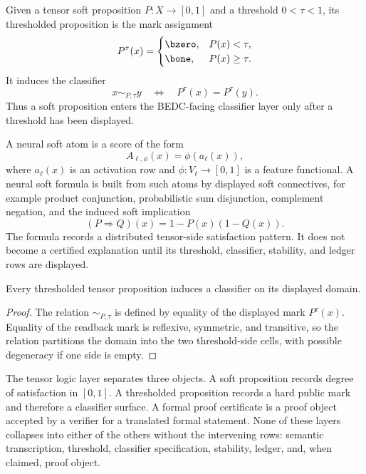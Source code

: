 \begin{definition}
\label{def:large-model-thresholded-tensor-proposition}
Given a tensor soft proposition $P:X\to[0,1]$ and a threshold
$0<\tau<1$, its thresholded proposition is the mark assignment
$$
P^\tau(x)
=
\begin{cases}
\bzero, & P(x)<\tau,\\
\bone, & P(x)\ge\tau.
\end{cases}
$$
It induces the classifier
$$
x\sim_{P,\tau}y
\quad\Longleftrightarrow\quad
P^\tau(x)=P^\tau(y).
$$
Thus a soft proposition enters the BEDC-facing classifier layer only
after a threshold has been displayed.
\end{definition}

\begin{definition}
\label{def:large-model-neural-soft-formula}
A neural soft atom is a score of the form
$$
A_{\ell,\phi}(x)=\phi(a_\ell(x)),
$$
where $a_\ell(x)$ is an activation row and $\phi:V_\ell\to[0,1]$ is a
feature functional. A neural soft formula is built from such atoms by
displayed soft connectives, for example product conjunction, probabilistic
sum disjunction, complement negation, and the induced soft implication
$$
(P\Rightarrow Q)(x)=1-P(x)(1-Q(x)).
$$
The formula records a distributed tensor-side satisfaction pattern. It
does not become a certified explanation until its threshold, classifier,
stability, and ledger rows are displayed.
\end{definition}

\begin{theorem}
\label{thm:large-model-soft-proposition-threshold-classifier}
Every thresholded tensor proposition induces a classifier on its displayed
domain.
\end{theorem}

\begin{proof}
The relation $\sim_{P,\tau}$ is defined by equality of the displayed mark
$P^\tau(x)$. Equality of the readback mark is reflexive, symmetric, and
transitive, so the relation partitions the domain into the two
threshold-side cells, with possible degeneracy if one side is empty.
\end{proof}

\begin{principle}
\label{prin:large-model-soft-logic-hard-classifier-proof-certificate}
The tensor logic layer separates three objects. A soft proposition records
degree of satisfaction in $[0,1]$. A thresholded proposition records a
hard public mark and therefore a classifier surface. A formal proof
certificate is a proof object accepted by a verifier for a translated
formal statement. None of these layers collapses into either of the
others without the intervening rows: semantic transcription, threshold,
classifier specification, stability, ledger, and, when claimed, proof
object.
\end{principle}

